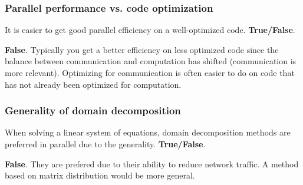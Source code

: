 \subsubsection{Parallel performance vs. code optimization} %
\label{ssub:parallel_performance_vs_code_optimization}


\begin{question}
  It is easier to get good parallel efficiency on a well-optimized code. \textbf{True/False}.
\end{question}

\textbf{False}. Typically you get a better efficiency on less optimized code since the balance between communication and computation has shifted (communication is more relevant). Optimizing for communication is often easier to do on code that has not already been optimized for computation.

\subsubsection{Generality of domain decomposition} %
\label{ssub:generality_of_domain_decomposition}


\begin{question}
  When solving a linear system of equations, domain decomposition methods are preferred in parallel due to the generality. \textbf{True/False}.
\end{question}

\textbf{False}. They are prefered due to their ability to reduce network traffic. A method based on matrix distribution would be more general.




